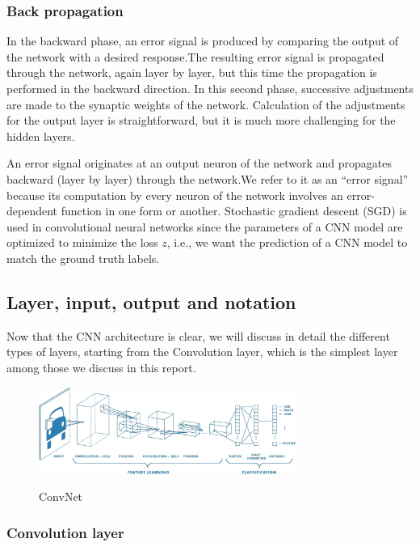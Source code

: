 \documentclass[12pt]{article}
\begin{document}
    \subsubsection{Back propagation}
    
    In the backward phase, an error signal is produced by comparing the output of the network with a desired response.The resulting error signal is propagated through
the network, again layer by layer, but this time the propagation is performed in the backward direction. In this second phase, successive adjustments are made to the
synaptic weights of the network. Calculation of the adjustments for the output layer is straightforward, but it is much more challenging for the hidden layers.

An error signal originates at an output neuron of the network and propagates backward (layer by layer) through the network.We refer to it as an “error signal” because its computation by every neuron of the network involves an
error-dependent function in one form or another. Stochastic gradient descent (SGD) is used in convolutional neural networks since the parameters of a CNN model are optimized to minimize the loss $z$, i.e., we want the prediction of a CNN model to match the ground truth labels.
    \subsection{Layer, input, output and notation}
		    
    Now that the CNN architecture is clear, we will discuss in detail the different types of layers, starting from the Convolution layer, which is the simplest layer among
those we discuss in this report.
\begin{figure}[h]
    	\centering
    	\includegraphics[width=0.75\textwidth]{cnn2.jpg}
       	\label{fig:mesh9}
	\caption{ConvNet}
	\end{figure} 

        \subsubsection{Convolution layer}
		
\end{document}
